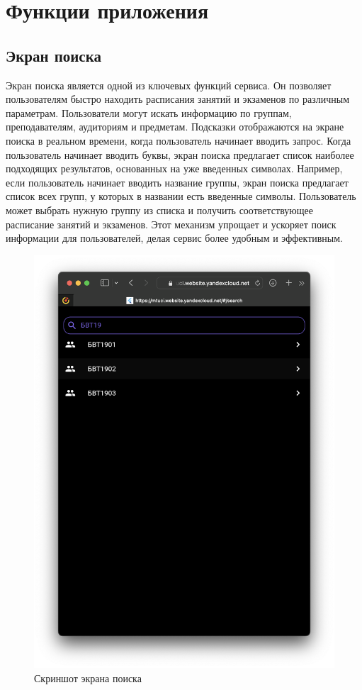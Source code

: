 \section{Функции приложения}
\subsection{Экран поиска}
Экран поиска является одной из ключевых функций сервиса.
Он позволяет пользователям быстро находить расписания занятий и экзаменов по различным параметрам.
Пользователи могут искать информацию по группам, преподавателям, аудиториям и предметам.
Подсказки отображаются на экране поиска в реальном времени, когда пользователь начинает вводить запрос.
Когда пользователь начинает вводить буквы, экран поиска предлагает список наиболее подходящих результатов,
основанных на уже введенных символах.
Например, если пользователь начинает вводить название группы,
экран поиска предлагает список всех групп, у которых в названии есть введенные символы.
Пользователь может выбрать нужную группу из списка и получить соответствующее расписание занятий и экзаменов.
Этот механизм упрощает и ускоряет поиск информации для пользователей,
делая сервис более удобным и эффективным.

\begin{figure}[h]
\centering
\includegraphics[width=0.8\linewidth]{images/search_screen.png}
\caption{Скриншот экрана поиска}
\label{fig:mpr}
\end{figure}